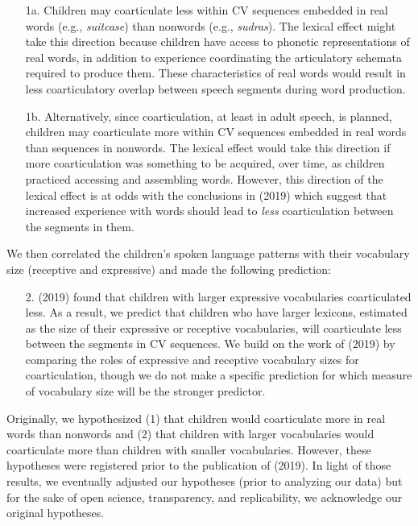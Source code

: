 \documentclass[a4paper,man,natbib,donotrepeattitle, apacite]{apa6}
\begin{document}
\begin{enumerate}
\item[1a.] Children may coarticulate less within CV sequences embedded in real words (e.g., \textit{suitcase}) than nonwords (e.g., \textit{sudras}). The lexical effect might take this direction because children have access to phonetic representations of real words, in addition to experience coordinating the articulatory schemata required to produce them. These characteristics of real words would result in less coarticulatory overlap between speech segments during word production.

\item[1b.] Alternatively, since coarticulation, at least in adult speech, is planned, children may coarticulate more within CV sequences embedded in real words than sequences in nonwords. The lexical effect would take this direction if more coarticulation was something to be acquired, over time, as children practiced accessing and assembling words. However, this direction of the lexical effect is at odds with the conclusions in \citeauthor{noiraySpokenLanguageDevelopment2019} (2019) which suggest that increased experience with words should lead to \textit{less} coarticulation between the segments in them. 
\end{enumerate}

We then correlated the children’s spoken language patterns with their vocabulary size (receptive and expressive) and made the following prediction: 

\begin{enumerate}
\item[2.] \citeauthor{noiraySpokenLanguageDevelopment2019} (2019) found that children with larger expressive vocabularies coarticulated less. As a result, we predict that children who have larger lexicons, estimated as the size of their expressive or receptive vocabularies, will coarticulate less between the segments in CV sequences. We build on the work of \citeauthor{noiraySpokenLanguageDevelopment2019} (2019) by comparing the roles of expressive and receptive vocabulary sizes for coarticulation, though we do not make a specific prediction for which measure of vocabulary size will be the stronger predictor.
\end{enumerate}

Originally, we hypothesized (1) that children would coarticulate more in real words than nonwords and (2) that children with larger vocabularies would coarticulate more than children with smaller vocabularies. However, these hypotheses were registered prior to the publication of \citeauthor{noiraySpokenLanguageDevelopment2019} (2019). In light of those results, we eventually adjusted our hypotheses (prior to analyzing our data) but for the sake of open science, transparency, and replicability, we acknowledge our original hypotheses. 
\end{document}
